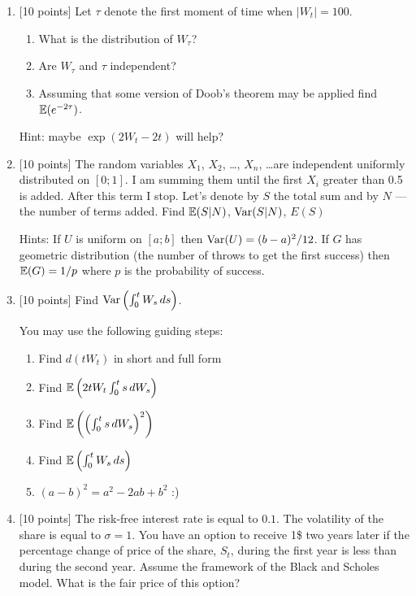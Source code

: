 \documentclass[12pt, a4paper]{article}
\begin{document}
\begin{enumerate}


\item $[$10 points] Let $\tau$ denote the first moment of time when $|W_t|=100$.
\begin{enumerate}
\item What is the distribution of $W_{\tau}$?
\item Are $W_{\tau}$ and $\tau$ independent?
\item Assuming that some version of Doob's theorem may be applied find $\mathbb{E}(e^{-2\tau})$.
\end{enumerate}
Hint: maybe $\exp(2 W_t - 2 t )$ will help?


\item $[$10 points] The random variables $X_1$, $X_2$, \ldots, $X_n$, \ldots are independent uniformly distributed on $[0; 1]$. I am summing them until the first $X_i$ greater than 0.5 is added. After this term I stop. Let’s denote by $S$ the total sum and by $N$ — the number of terms added. Find $\mathbb{E}(S|N)$, $\operatorname{Var}(S|N)$, $E(S)$ %

Hints: If $U$ is uniform on $[a;b]$ then $\operatorname{Var}(U)=(b-a)^2/12$. If $G$ has geometric distribution (the number of throws to get the first success) then $\mathbb{E}(G)=1/p$  where $p$  is the probability of success.

\item $[$10 points] Find $\operatorname{Var}\left(  \int_0^t W_s \, ds  \right)$.

You may use the following guiding steps:

\begin{enumerate}
\item Find $d(tW_t)$ in short and full form
\item Find $\mathbb{E}\left(2t W_t\int_0^t s \, dW_s\right)$
\item Find $\mathbb{E}\left(\left(\int_0^t s \, dW_s\right)^2 \right)$
\item Find $\mathbb{E}\left(  \int_0^t W_s \, ds  \right)$
\item $(a-b)^2=a^2-2ab+b^2$ :)
\end{enumerate}

\item $[$10 points] The risk-free interest rate is equal to $0.1$. The volatility of the share is equal to $\sigma=1$. You have an option to receive 1\$ two years later if the percentage change of price of the share, $S_t$, during the first year is less than during the second year. Assume the framework of the Black and Scholes model. What is the fair price of this option?


\end{enumerate}
\end{document}
